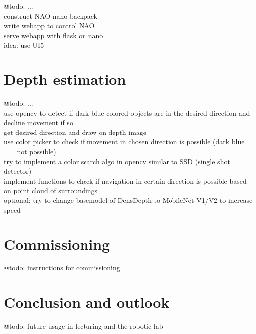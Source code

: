 \documentclass[12pt]{article}
\begin{document}
@todo: ...\\

construct NAO-nano-backpack\\
write webapp to control NAO\\
serve webapp with flask on nano\\

idea: use UI5

\section{Depth estimation}

@todo: ...\\

use opencv to detect if dark blue colored objects are in the desired direction and decline movement if so\\

get desired direction and draw on depth image\\
use color picker to check if movement in chosen direction is possible (dark blue == not possible)\\
try to implement a color search algo in opencv similar to SSD (single shot detector)\\

implement functions to check if navigation in certain direction is possible based on point cloud of surroundings\\
optional: try to change basemodel of DensDepth to MobileNet V1/V2 to increase speed

\section{Commissioning}

@todo: instructions for commissioning

\section{Conclusion and outlook}

@todo: future usage in lecturing and the robotic lab
\end{document}
